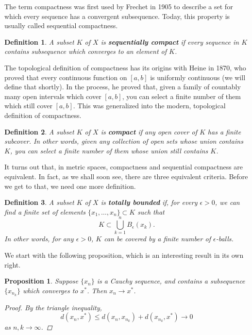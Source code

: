 \documentclass[12pt]{amsart}         %
\newtheorem{definition}{Definition}[section]
\newtheorem{proposition}{Proposition}[section]
\theoremstyle{remark}
\begin{document}
The term compactness was first used by Frechet in 1905 to describe a set for which every sequence has a convergent subsequence. Today, this property is usually called sequential compactness.

\begin{definition}
A subset $K$ of $X$ is \textbf{sequentially compact} if every sequence in $K$ contains subsequence which converges to an element of $K$.
\end{definition}

The topological definition of compactness has its origins with Heine in 1870, who proved that every continuous function on $[a,b]$ is uniformly continuous (we will define that shortly). In the process, he proved that, given a family of countably many open intervals which cover $[a, b]$, you can select a finite number of them which still cover $[a, b]$. This was generalized into the modern, topological definition of compactness.

\begin{definition}
A subset $K$ of $X$ is \textbf{compact} if any open cover of $K$ has a finite subcover. In other words, given any collection of open sets whose union contains $K$, you can select a finite number of them whose union still contains $K$.
\end{definition}

It turns out that, in metric spaces, compactness and sequential compactness are equivalent. In fact, as we shall soon see, there are three equivalent criteria. Before we get to that, we need one more definition.

\begin{definition}
A subset $K$ of $X$ is \textbf{totally bounded} if, for every $\epsilon > 0$, we can find a finite set of elements $\{ x_1, \dots, x_n \} \subset K$ such that 
\[
K \subset \bigcup_{k=1}^n B_\epsilon(x_k).
\]
In other words, for any $\epsilon > 0$, $K$ can be covered by a finite number of $\epsilon$-balls.
\end{definition}

We start with the following proposition, which is an interesting result in its own right.

\begin{proposition}
Suppose $\{x_n\}$ is a Cauchy sequence, and contains a subsequence $\{x_{n_k} \}$ which converges to $x^*$. Then $x_n \rightarrow x^*$.
\begin{proof}
By the triangle inequality,
\[
d(x_n, x^*) \leq d(x_n, x_{n_k}) + d(x_{n_k}, x^*) \rightarrow 0
\]
as $n, k \rightarrow \infty$.
\end{proof}
\end{proposition}
\end{document}
